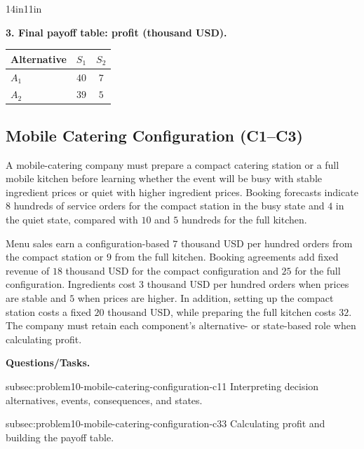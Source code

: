 \begin{CalculationLandscape}{14in}{11in}
\noindent\begin{minipage}{\linewidth}
\textbf{3. Final payoff table: profit (thousand USD).}
\begin{center}
\begin{tabular}{@{}lcc@{}}
\toprule
Alternative & \(S_1\) & \(S_2\) \\
\midrule
\(A_1\) & \(40\) & \(7\) \\
\(A_2\) & \(39\) & \(5\) \\
\bottomrule
\end{tabular}
\end{center}
\end{minipage}



\end{CalculationLandscape}


	\subsection{Mobile Catering Configuration (C1--C3)}
	\label{sec:problem10-mobile-catering-configuration-c1-c3}

	A mobile-catering company must prepare a compact catering station or a full mobile kitchen before learning whether the event will be busy with stable ingredient prices or quiet with higher ingredient prices. Booking forecasts indicate \(8\) hundreds of service orders for the compact station in the busy state and \(4\) in the quiet state, compared with \(10\) and \(5\) hundreds for the full kitchen.

	Menu sales earn a configuration-based \(7\) thousand USD per hundred orders from the compact station or \(9\) from the full kitchen. Booking agreements add fixed revenue of \(18\) thousand USD for the compact configuration and \(25\) for the full configuration. Ingredients cost \(3\) thousand USD per hundred orders when prices are stable and \(5\) when prices are higher. In addition, setting up the compact station costs a fixed \(20\) thousand USD, while preparing the full kitchen costs \(32\). The company must retain each component's alternative- or state-based role when calculating profit.

	\textbf{Questions/Tasks.}
	\begin{enumerate}
		\CriterionTask
		{subsec:problem10-mobile-catering-configuration-c1}{1}
		{Interpreting decision alternatives, events, consequences, and states.}

		\CriterionTask
		{subsec:problem10-mobile-catering-configuration-c3}{3}
		{Calculating profit and building the payoff table.}
	\end{enumerate}

